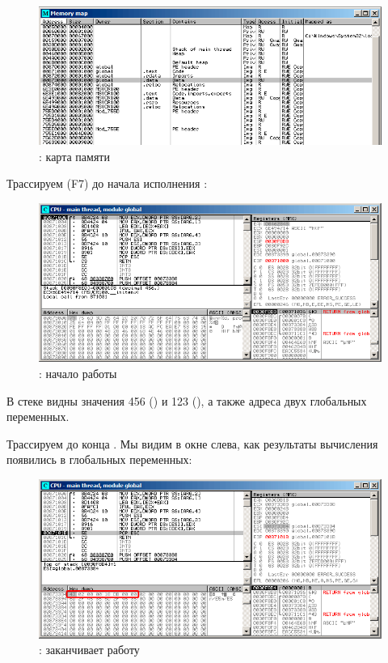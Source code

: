 \begin{figure}[H]
\centering
\includegraphics[scale=\FigScale]{patterns/061_pointers/olly_global5.png}
\caption{\olly: карта памяти}
\label{fig:pointers_olly_global_5}
\end{figure}

\clearpage
Трассируем (F7) до начала исполнения \ttfone: 

\begin{figure}[H]
\centering
\includegraphics[scale=\FigScale]{patterns/061_pointers/olly_global2.png}
\caption{\olly: начало работы \ttfone}
\label{fig:pointers_olly_global_2}
\end{figure}

В стеке видны значения 456 () и 123 (), а также адреса двух глобальных переменных.

\clearpage
Трассируем до конца \ttfone.
Мы видим в окне слева, как результаты вычисления появились в глобальных переменных: 

\begin{figure}[H]
\centering
\includegraphics[scale=\FigScale]{patterns/061_pointers/olly_global3.png}
\caption{\olly: \ttfone заканчивает работу}
\label{fig:pointers_olly_global_3}
\end{figure}

